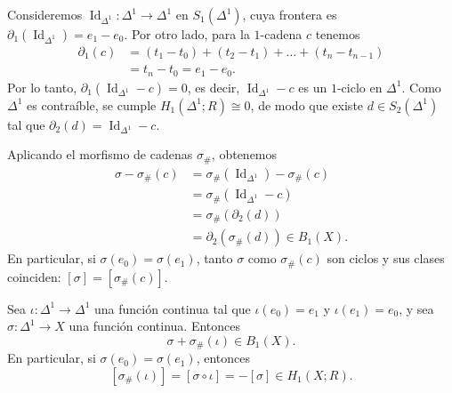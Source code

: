 \begin{dem}
Consideremos $\operatorname{Id}_{\Delta^1} \colon \Delta^1 \to \Delta^1$ en $S_1(\Delta^1)$, cuya frontera es $\partial_1(\operatorname{Id}_{\Delta^1}) = e_1 - e_0$. Por otro lado, para la $1$-cadena $c$ tenemos
\begin{align*}
\partial_1(c) &= (t_1 - t_0) + (t_2 - t_1) + \dots + (t_n - t_{n-1}) \\
&= t_n - t_0 = e_1 - e_0.
\end{align*}
Por lo tanto, $\partial_1(\operatorname{Id}_{\Delta^1} - c) = 0$, es decir, $\operatorname{Id}_{\Delta^1} - c$ es un $1$-ciclo en $\Delta^1$. Como $\Delta^1$ es contraíble, se cumple $H_1(\Delta^1; R) \cong 0$, de modo que existe $d \in S_2(\Delta^1)$ tal que $\partial_2(d) = \operatorname{Id}_{\Delta^1} - c$.

Aplicando el morfismo de cadenas $\sigma_\#$, obtenemos
\begin{align*}
\sigma - \sigma_\#(c) &= \sigma_\#(\operatorname{Id}_{\Delta^1}) - \sigma_\#(c) \\
&= \sigma_\#(\operatorname{Id}_{\Delta^1} - c) \\
&= \sigma_\#(\partial_2(d)) \\
&= \partial_2(\sigma_\#(d)) \in B_1(X).
\end{align*}
En particular, si $\sigma(e_0) = \sigma(e_1)$, tanto $\sigma$ como $\sigma_\#(c)$ son ciclos y sus clases coinciden: $[\sigma] = [\sigma_\#(c)]$.
\end{dem}

\begin{lema}[Lema 2]
Sea $\iota \colon \Delta^1 \to \Delta^1$ una función continua tal que $\iota(e_0) = e_1$ y $\iota(e_1) = e_0$, y sea $\sigma \colon \Delta^1 \to X$ una función continua. Entonces
\[
\sigma + \sigma_\#(\iota) \in B_1(X).
\]
En particular, si $\sigma(e_0) = \sigma(e_1)$, entonces
\[
[\sigma_\#(\iota)] = [\sigma \circ \iota] = -[\sigma] \in H_1(X; R).
\]
\end{lema}

